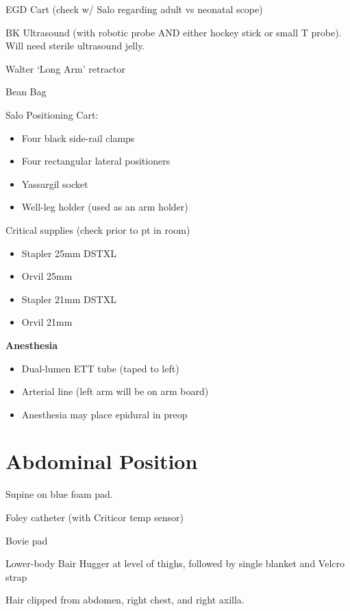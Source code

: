 \documentclass[
  letterpaper,
]{scrbook}
\providecommand{\tightlist}{%
  \setlength{\itemsep}{0pt}\setlength{\parskip}{0pt}}
\begin{document}
EGD Cart (check w/ Salo regarding adult vs neonatal scope)

BK Ultrasound (with robotic probe AND either hockey stick or small T
probe). Will need sterile ultrasound jelly.

Walter `Long Arm' retractor

Bean Bag

Salo Positioning Cart:

\begin{itemize}
\tightlist
\item
  Four black side-rail clamps
\item
  Four rectangular lateral positioners
\item
  Yassargil socket
\item
  Well-leg holder (used as an arm holder)
\end{itemize}

Critical supplies (check prior to pt in room)

\begin{itemize}
\tightlist
\item
  Stapler 25mm DSTXL
\item
  Orvil 25mm
\item
  Stapler 21mm DSTXL
\item
  Orvil 21mm
\end{itemize}

\newpage

\textbf{Anesthesia}

\begin{itemize}
\tightlist
\item
  Dual-lumen ETT tube (taped to left)
\item
  Arterial line (left arm will be on arm board)
\item
  Anesthesia may place epidural in preop
\end{itemize}

\section{Abdominal Position}\label{abdominal-position}

Supine on blue foam pad.

Foley catheter (with Criticor temp sensor)

Bovie pad

Lower-body Bair Hugger at level of thighs, followed by single blanket
and Velcro strap

Hair clipped from abdomen, right chest, and right axilla.
\end{document}

